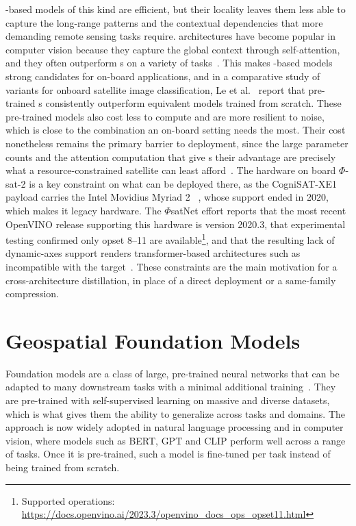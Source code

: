 -based models of this kind are efficient, but their locality leaves them less able to capture the long-range patterns and the contextual dependencies that more demanding remote sensing tasks require.
 architectures have become popular in computer vision because they capture the global context through self-attention, and they often outperform s on a variety of tasks~\cite{han2022survey}.
This makes -based models strong candidates for on-board  applications, and in a comparative study of  variants for onboard satellite image classification, Le et al.~\cite{le2024onboard} report that pre-trained s consistently outperform equivalent models trained from scratch.
These pre-trained models also cost less to compute and are more resilient to noise, which is close to the combination an on-board setting needs the most.
Their cost nonetheless remains the primary barrier to deployment, since the large parameter counts and the attention computation that give s their advantage are precisely what a resource-constrained satellite can least afford~\cite{chou2023edge}.
The hardware on board $\Phi$-sat-2 is a key constraint on what can be deployed there, as the CogniSAT-XE1 payload carries the Intel Movidius Myriad 2 ~\cite{myriad2}, whose support ended in 2020, which makes it legacy hardware.
The $\Phi$satNet effort reports that the most recent OpenVINO release supporting this hardware is version 2020.3, that experimental testing confirmed only  opset 8--11 are available\footnote{Supported operations: \url{https://docs.openvino.ai/2023.3/openvino_docs_ops_opset11.html}}, and that the resulting lack of dynamic-axes support renders transformer-based architectures such as  incompatible with the target~\cite{phisatnet}.
These constraints are the main motivation for a cross-architecture distillation, in place of a direct deployment or a same-family compression.

\section{Geospatial Foundation Models}

Foundation models are a class of large, pre-trained neural networks that can be adapted to many downstream tasks with a minimal additional training~\cite{bommasani2021opportunities}.
They are pre-trained with self-supervised learning on massive and diverse datasets, which is what gives them the ability to generalize across tasks and domains.
The approach is now widely adopted in natural language processing and in computer vision, where models such as BERT, GPT and CLIP perform well across a range of tasks.
Once it is pre-trained, such a model is fine-tuned per task instead of being trained from scratch.

